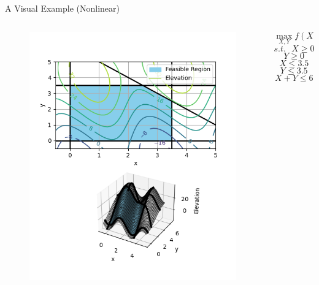 \documentclass[10pt, aspectratio=169]{beamer}
\begin{document}
\begin{frame}{A Visual Example (Nonlinear)}
    \begin{columns}
        \begin{column}{0.5\textwidth}
            \begin{figure}
                \includegraphics[width=0.9\linewidth]{NonlinearObjective.png}
            \end{figure}
        \end{column}
        \begin{column}{0.5\textwidth}
            $$\max_{X,Y} f(X,Y)$$
            $$s.t. \ \ \ X\geq 0$$
            $$Y \geq 0$$
            $$X \leq 3.5$$
            $$Y \leq 3.5$$
            $$X + Y \leq 6$$
        \end{column}
    \end{columns}
\end{frame}
\end{document}
